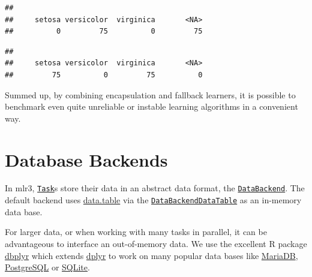 \documentclass[
]{scrbook}
\newenvironment{Shaded}{\begin{snugshade}}{\end{snugshade}}
\newcommand{\AttributeTok}[1]{\textcolor[rgb]{0.77,0.63,0.00}{#1}}
\newcommand{\CommentTok}[1]{\textcolor[rgb]{0.56,0.35,0.01}{\textit{#1}}}
\newcommand{\FunctionTok}[1]{\textcolor[rgb]{0.00,0.00,0.00}{#1}}
\newcommand{\NormalTok}[1]{#1}
\newcommand{\OtherTok}[1]{\textcolor[rgb]{0.56,0.35,0.01}{#1}}
\newcommand{\SpecialCharTok}[1]{\textcolor[rgb]{0.00,0.00,0.00}{#1}}
\newcommand{\StringTok}[1]{\textcolor[rgb]{0.31,0.60,0.02}{#1}}
\renewenvironment{Shaded} {\begin{snugshade}\small} {\end{snugshade}}
\begin{document}
\begin{verbatim}
## 
##     setosa versicolor  virginica       <NA> 
##          0         75          0         75
\end{verbatim}

\begin{Shaded}
\end{Shaded}

\begin{verbatim}
## 
##     setosa versicolor  virginica       <NA> 
##         75          0         75          0
\end{verbatim}

Summed up, by combining encapsulation and fallback learners, it is possible to benchmark even quite unreliable or instable learning algorithms in a convenient way.

\hypertarget{backends}{%
\section{Database Backends}\label{backends}}

In mlr3, \href{https://mlr3.mlr-org.com/reference/Task.html}{\texttt{Task}}s store their data in an abstract data format, the \href{https://mlr3.mlr-org.com/reference/DataBackend.html}{\texttt{DataBackend}}.
The default backend uses \href{https://cran.r-project.org/package=data.table}{data.table} via the \href{https://mlr3.mlr-org.com/reference/DataBackendDataTable.html}{\texttt{DataBackendDataTable}} as an in-memory data base.

For larger data, or when working with many tasks in parallel, it can be advantageous to interface an out-of-memory data.
We use the excellent R package \href{https://cran.r-project.org/package=dbplyr}{dbplyr} which extends \href{https://cran.r-project.org/package=dplyr}{dplyr} to work on many popular data bases like \href{https://mariadb.org/}{MariaDB}, \href{https://www.postgresql.org/}{PostgreSQL} or \href{https://www.sqlite.org}{SQLite}.
\end{document}
